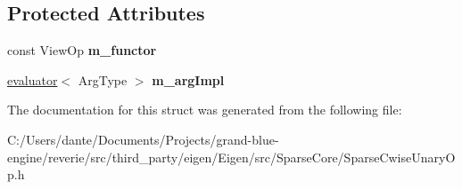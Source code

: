 \subsection*{Protected Attributes}
\begin{DoxyCompactItemize}
\item 
\mbox{\label{struct_eigen_1_1internal_1_1unary__evaluator_3_01_cwise_unary_view_3_01_view_op_00_01_arg_type_01_4_00_01_iterator_based_01_4_a6fb281b3edf00e5292504f2e7562c764}} 
const View\+Op {\bfseries m\+\_\+functor}
\item 
\mbox{\label{struct_eigen_1_1internal_1_1unary__evaluator_3_01_cwise_unary_view_3_01_view_op_00_01_arg_type_01_4_00_01_iterator_based_01_4_a457cb9d3de03b730e2a93c16138f8386}} 
\mbox{\hyperlink{struct_eigen_1_1internal_1_1evaluator}{evaluator}}$<$ Arg\+Type $>$ {\bfseries m\+\_\+arg\+Impl}
\end{DoxyCompactItemize}


The documentation for this struct was generated from the following file\+:\begin{DoxyCompactItemize}
\item 
C\+:/\+Users/dante/\+Documents/\+Projects/grand-\/blue-\/engine/reverie/src/third\+\_\+party/eigen/\+Eigen/src/\+Sparse\+Core/Sparse\+Cwise\+Unary\+Op.\+h\end{DoxyCompactItemize}
